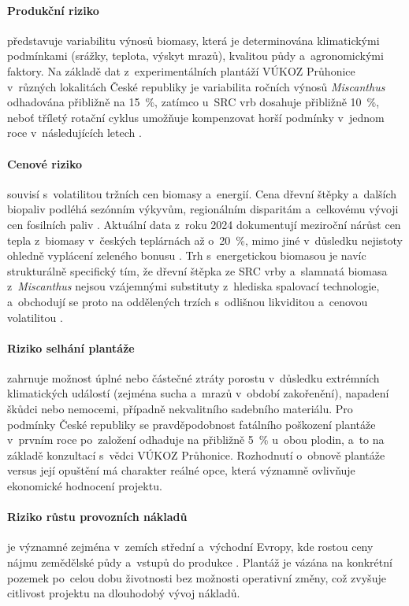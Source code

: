 \paragraph{Produkční riziko}
představuje variabilitu výnosů biomasy, která je determinována klimatickými
podmínkami (srážky, teplota, výskyt mrazů), kvalitou půdy a~agronomickými
faktory. Na základě dat z~experimentálních plantáží VÚKOZ Průhonice
v~různých lokalitách České republiky je variabilita ročních výnosů
\textit{Miscanthus} odhadována přibližně na 15~\%, zatímco u~SRC vrb
dosahuje přibližně 10~\%, neboť tříletý rotační cyklus umožňuje
kompenzovat horší podmínky v~jednom roce v~následujících letech
\citep{knapek_2024}.

\paragraph{Cenové riziko}
souvisí s~volatilitou tržních cen biomasy a~energií. Cena dřevní štěpky
a~dalších biopaliv podléhá sezónním výkyvům, regionálním disparitám
a~celkovému vývoji cen fosilních paliv \citep{knapek_2024}. Aktuální
data z~roku 2024 dokumentují meziroční nárůst cen tepla z~biomasy
v~českých teplárnách až o~20~\%, mimo jiné v~důsledku nejistoty ohledně
vyplácení zeleného bonusu \citep{tscr_2024}. Trh s~energetickou biomasou
je navíc strukturálně specifický tím, že dřevní štěpka ze SRC vrby
a~slamnatá biomasa z~\textit{Miscanthus} nejsou vzájemnými substituty
z~hlediska spalovací technologie, a~obchodují se proto na oddělených
trzích s~odlišnou likviditou a~cenovou volatilitou
\citep{Knapek2026Komunikace}.

\paragraph{Riziko selhání plantáže}
zahrnuje možnost úplné nebo částečné ztráty porostu v~důsledku extrémních
klimatických událostí (zejména sucha a~mrazů v~období zakořenění),
napadení škůdci nebo nemocemi, případně nekvalitního sadebního materiálu.
Pro podmínky České republiky se pravděpodobnost fatálního poškození
plantáže v~prvním roce po~založení odhaduje na přibližně 5~\% u~obou
plodin, a~to na základě konzultací s~vědci VÚKOZ Průhonice. Rozhodnutí
o~obnově plantáže versus její opuštění má charakter reálné opce, která
významně ovlivňuje ekonomické hodnocení projektu.

\paragraph{Riziko růstu provozních nákladů}
je významné zejména v~zemích střední a~východní Evropy, kde rostou ceny
nájmu zemědělské půdy a~vstupů do produkce \citep{knapek_2024}. Plantáž
je vázána na konkrétní pozemek po~celou dobu životnosti bez možnosti
operativní změny, což zvyšuje citlivost projektu na dlouhodobý vývoj
nákladů.

